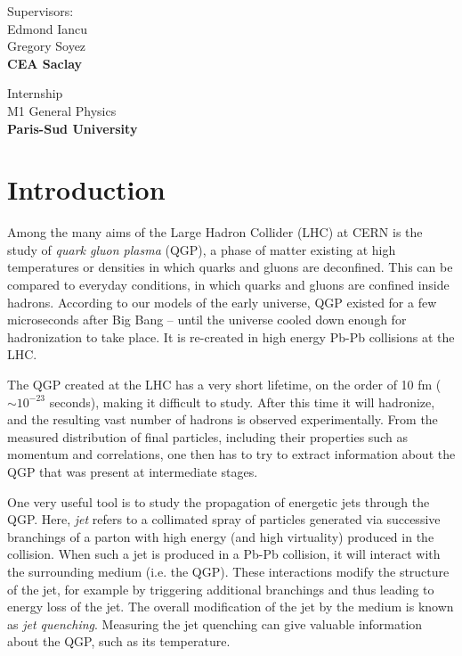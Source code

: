 \documentclass[a4paper,12pt]{article}
\numberwithin{equation}{section}
\begin{document}
\begin{titlepage}
\vspace*{1cm}
\begin{minipage}{0.45\linewidth}
\begin{flushleft}   
Supervisors:\\Edmond Iancu\\Gregory Soyez\\{\bf CEA Saclay}
\end{flushleft}   
\end{minipage}
\begin{minipage}{0.45\linewidth}
\begin{flushright}
Internship\\M1 General Physics\\{\bf Paris-Sud University}
\end{flushright}
\end{minipage}

\end{titlepage}


\maketitle
\newpage
{}
\section{Introduction}


Among the many aims of the Large Hadron Collider (LHC) at CERN is the study of \emph{quark gluon plasma} (QGP), a phase of matter existing at high temperatures or densities in which quarks and gluons are deconfined. This can be compared to everyday conditions, in which quarks and gluons are confined inside hadrons. According to our models of the early universe, QGP existed for a few microseconds after Big Bang -- until the universe cooled down enough for hadronization to take place. It is re-created in high energy Pb-Pb collisions at the LHC.


The QGP created at the LHC has a very short lifetime, on the order of 10 fm ($\sim 10^{-23}$ seconds), making it difficult to study. After this time it will hadronize, and the resulting vast number of hadrons is observed experimentally. From the measured distribution of final particles, including their properties such as momentum and correlations, one then has to try to extract information about the QGP that was present at intermediate stages. 


One very useful tool is to study the propagation of energetic jets through the QGP. Here, \emph{jet} refers to a collimated spray of particles generated via successive branchings of a parton with high energy (and high virtuality) produced in the collision. When such a jet is produced in a Pb-Pb collision, it will interact with the surrounding medium (i.e. the QGP). These interactions modify the structure of the jet, for example by triggering additional branchings and thus leading to energy loss of the jet. The overall modification of the jet by the medium is known as \emph{jet quenching}. Measuring the jet quenching can give valuable information about the QGP, such as its temperature. 
\end{document}
